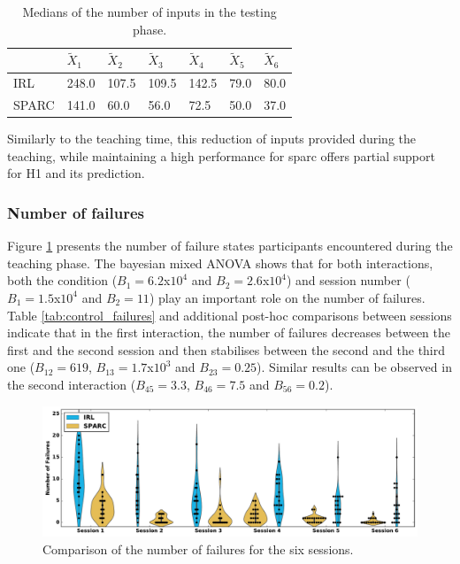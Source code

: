 \begin{table}[ht]
	\centering
	\caption{Medians of the number of inputs in the testing phase.}
	\label{tab:control_inputs}
	\begin{tabular}{@{}lllllll@{}} \toprule
		& $\widetilde{X}_{1}$ & $\widetilde{X}_{2}$ & $\widetilde{X}_{3}$ & $\widetilde{X}_{4}$ & $\widetilde{X}_{5}$ & $\widetilde{X}_{6}$\\ 
		\midrule
    IRL & 248.0 & 107.5 & 109.5 & 142.5 & 79.0 & 80.0\\
    SPARC & 141.0 & 60.0 & 56.0 & 72.5 & 50.0 & 37.0\\
    \bottomrule
	\end{tabular}
\end{table}

Similarly to the teaching time, this reduction of inputs provided during the teaching, while maintaining a high performance for \gls{sparc} offers partial support for H1 and its prediction.

\subsubsection{Number of failures}

Figure \ref{fig:control_failures} presents the number of failure states participants encountered during the teaching phase. The bayesian mixed ANOVA shows that for both interactions, both the condition ($B_1=6.2$x$10^4$ and $B_2 = 2.6$x$10^4$) and session number ($B_1=1.5$x$10^4$ and $B_2 = 11$) play an important role on the number of failures. Table \ref{tab:control_failures} and additional post-hoc comparisons between sessions indicate that in the first interaction, the number of failures decreases between the first and the second session and then stabilises between the second and the third one ($B_{12}=619$, $B_{13}=1.7$x$10^3$ and $B_{23}=0.25$). Similar results can be observed in the second interaction ($B_{45}=3.3$, $B_{46}=7.5$ and $B_{56}=0.2$).

\begin{figure}[ht]
	\includegraphics[width=\textwidth]{failures.pdf}
	\centering
	\caption{Comparison of the number of failures for the six sessions.
	}
	\label{fig:control_failures}
\end{figure}

